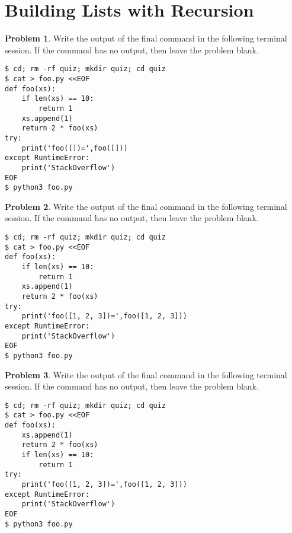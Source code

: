 \documentclass[10pt]{article}
\theoremstyle{definition}
\newtheorem{problem}{Problem}
\begin{document}
\filbreak
\section{Building Lists with Recursion}

\begin{problem}
    Write the output of the final command in the following terminal session.
    If the command has no output, then leave the problem blank.
\end{problem}
\begin{lstlisting}
$ cd; rm -rf quiz; mkdir quiz; cd quiz
$ cat > foo.py <<EOF
def foo(xs):
    if len(xs) == 10:
        return 1
    xs.append(1)
    return 2 * foo(xs)
try:
    print('foo([])=',foo([]))
except RuntimeError:
    print('StackOverflow')
EOF
$ python3 foo.py
\end{lstlisting}


\filbreak
\begin{problem}
    Write the output of the final command in the following terminal session.
    If the command has no output, then leave the problem blank.
\end{problem}
\begin{lstlisting}
$ cd; rm -rf quiz; mkdir quiz; cd quiz
$ cat > foo.py <<EOF
def foo(xs):
    if len(xs) == 10:
        return 1
    xs.append(1)
    return 2 * foo(xs)
try:
    print('foo([1, 2, 3])=',foo([1, 2, 3]))
except RuntimeError:
    print('StackOverflow')
EOF
$ python3 foo.py
\end{lstlisting}

\filbreak
\begin{problem}
    Write the output of the final command in the following terminal session.
    If the command has no output, then leave the problem blank.
\end{problem}
\begin{lstlisting}
$ cd; rm -rf quiz; mkdir quiz; cd quiz
$ cat > foo.py <<EOF
def foo(xs):
    xs.append(1)
    return 2 * foo(xs)
    if len(xs) == 10:
        return 1
try:
    print('foo([1, 2, 3])=',foo([1, 2, 3]))
except RuntimeError:
    print('StackOverflow')
EOF
$ python3 foo.py
\end{lstlisting}
\end{document}
